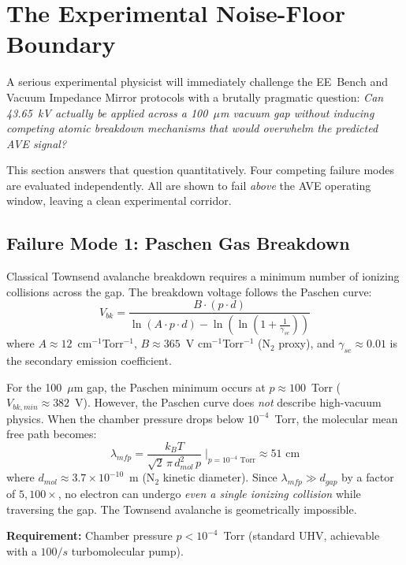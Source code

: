\section{The Experimental Noise-Floor Boundary}
\label{sec:noise_floor}

A serious experimental physicist will immediately challenge the EE~Bench and Vacuum Impedance Mirror protocols with a brutally pragmatic question: \textit{Can 43.65~kV actually be applied across a 100~$\mu$m vacuum gap without inducing competing atomic breakdown mechanisms that would overwhelm the predicted AVE signal?}

This section answers that question quantitatively. Four competing failure modes are evaluated independently. All are shown to fail \textit{above} the AVE operating window, leaving a clean experimental corridor.

\subsection{Failure Mode 1: Paschen Gas Breakdown}

Classical Townsend avalanche breakdown requires a minimum number of ionizing collisions across the gap. The breakdown voltage follows the Paschen curve:
\begin{equation}
    V_{bk} = \frac{B \cdot (p \cdot d)}{\ln(A \cdot p \cdot d) - \ln\!\left(\ln\!\left(1 + \frac{1}{\gamma_{se}}\right)\right)}
    \label{eq:paschen}
\end{equation}
where $A \approx 12$~cm$^{-1}$Torr$^{-1}$, $B \approx 365$~V cm$^{-1}$Torr$^{-1}$ (N$_2$ proxy), and $\gamma_{se} \approx 0.01$ is the secondary emission coefficient.

For the 100~$\mu$m gap, the Paschen minimum occurs at $p \approx 100$~Torr ($V_{bk,min} \approx 382$~V). However, the Paschen curve does \textit{not} describe high-vacuum physics. When the chamber pressure drops below $10^{-4}$~Torr, the molecular mean free path becomes:
\begin{equation}
    \lambda_{mfp} = \frac{k_B T}{\sqrt{2}\, \pi\, d_{mol}^2\, p} \;\bigg|_{p = 10^{-4}\text{ Torr}} \approx 51\text{ cm}
\end{equation}
where $d_{mol} \approx 3.7 \times 10^{-10}$~m (N$_2$ kinetic diameter). Since $\lambda_{mfp} \gg d_{gap}$ by a factor of $5{,}100\times$, no electron can undergo \textit{even a single ionizing collision} while traversing the gap. The Townsend avalanche is geometrically impossible.

\textbf{Requirement:} Chamber pressure $p < 10^{-4}$~Torr (standard UHV, achievable with a $100/s$ turbomolecular pump).

